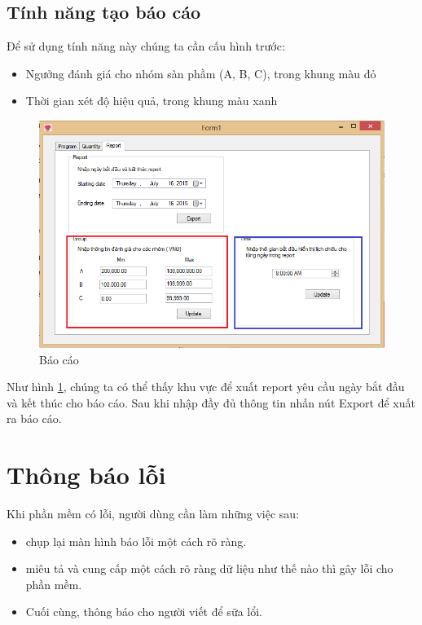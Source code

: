\documentclass[11pt]{article}
\begin{document}
\subsection{Tính năng tạo báo cáo}
\indent Để sử dụng tính năng này chúng ta cần cấu hình trước:
\begin{itemize}
	\item Ngưởng đánh giá cho nhóm sàn phầm (A, B, C), trong khung màu đỏ
	\item Thời gian xét độ hiệu quả, trong khung màu xanh 
\end{itemize}
\begin{figure}[h!]
	\begin{center}
		\includegraphics[width=15cm]{report.png}
	\end{center}
	\caption{Báo cáo}
	\label{report}
\end{figure}
\indent Như hình \ref{report}, chúng ta có thể thấy khu vực để xuất report yêu cầu ngày bắt đầu và kết thúc cho báo cáo. Sau khi nhập đầy đủ thông tin nhấn nút Export để xuất ra báo cáo.
\section{Thông báo lỗi}
\indent Khi phần mềm có lỗi, người dùng cần làm những việc sau:
\begin{itemize}
	\item chụp lại màn hình báo lỗi một cách rõ ràng.
	\item miêu tả và cung cấp một cách rõ ràng dữ liệu như thế nào thì gây lỗi cho phần mềm.
	\item Cuối cùng, thông báo cho người viết để sữa lổi.
\end{itemize}
\end{document}
